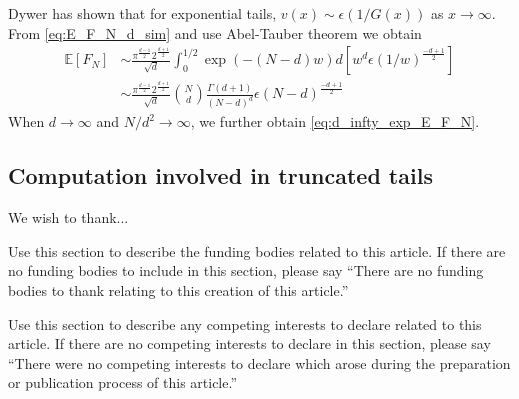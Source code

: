 \documentclass{aptpub}
\def\E{\mathbb{E}}
\begin{document}
Dywer has shown that for exponential tails, $v(x) \sim \epsilon(1/G(x))$ as $x\to \infty$.
From \eqref{eq:E_F_N_d_sim}
and use Abel-Tauber theorem
\cite{omey1989abelian} we obtain
\begin{align*}
    \E[F_N] & \sim \frac{\pi^{\frac{d-1}{2}} 2^{\frac{d+1}{2}}}{\sqrt{d}}\int_0^{1/2} \exp(-(N-d)w) d[w^d \epsilon(1/w)^{\frac{-d+1}{2}}] \\
    &\sim \frac{\pi^{\frac{d-1}{2}} 2^{\frac{d+1}{2}}}{\sqrt{d}} \binom{N}{d}\frac{\Gamma(d+1)}{(N-d)^d} \epsilon(N-d)^{\frac{-d+1}{2}}
\end{align*}
When $d\to\infty$ and $N/d^2\to \infty$, we further obtain \eqref{eq:d_infty_exp_E_F_N}.
 
\subsection{Computation involved in truncated tails}



\acks %
\noindent We wish to thank...



\fund %
\noindent Use this section to describe the funding bodies related to this article. If there are no funding bodies to include in this section, please say ``There are no funding bodies to thank relating to this creation of this article.''



\competing %
\noindent Use this section to describe any competing interests to declare related to this article. If there are no competing interests to declare in this section, please say ``There were no competing interests to declare which arose during the preparation or publication process of this article.''
\end{document}
